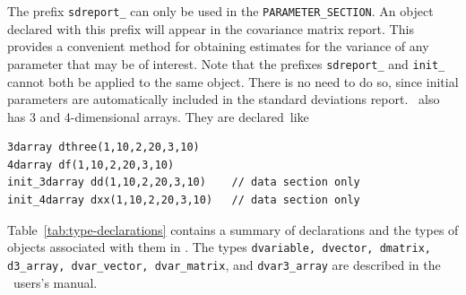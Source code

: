 \documentclass{admbmanual}
\newcommand\PS{\texttt{PARAMETER\_SECTION}}
\begin{document}
The prefix \texttt{sdreport\_} can only be used in the \PS.
An object declared with this prefix will appear in the
covariance matrix report. This provides a convenient method for
obtaining estimates for the variance of any parameter
that may be of interest. Note that the prefixes
\texttt{sdreport\_} and \texttt{init\_} cannot both be applied to the
same object. There is no need to do so, since 
initial parameters are automatically included in the
standard deviations report.
\ADM\ also has 3 and 4-dimensional arrays. They are declared~like
\begin{lstlisting}
3darray dthree(1,10,2,20,3,10)
4darray df(1,10,2,20,3,10)
init_3darray dd(1,10,2,20,3,10)    // data section only
init_4darray dxx(1,10,2,20,3,10)   // data section only
\end{lstlisting}
Table~\ref{tab:type-declarations} contains a summary of declarations and the types of 
objects associated with them in \ADM. The types \texttt{dvariable,
dvector, dmatrix, d3\_array, dvar\_vector, dvar\_matrix}, and \texttt{dvar3\_array}
are described in the \scAD\ users's manual.

\end{document}
